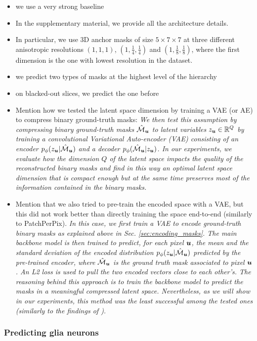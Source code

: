 \begin{itemize}
\item we use a very strong baseline
\item In the supplementary material, we provide all the architecture details.
\item In particular, we use 3D anchor masks of size $5\times 7 \times 7$ at three different anisotropic resolutions $(1,1,1)$, $(1,\frac{1}{4},\frac{1}{4})$ and $(1,\frac{1}{8},\frac{1}{8})$, where the first dimension is the one with lowest resolution in the dataset.
\item we predict two types of \maskname masks at the highest level of the hierarchy
\item on blacked-out slices, we predict the one before
\item Mention how we tested the latent space dimension by training a VAE (or AE) to compress binary ground-truth \maskname masks: \emph{We then test this assumption by compressing binary ground-truth \maskname masks $\hat{\mathcal{M}}_{\coord{u}}$ to latent variables $z_{\coord{u}}\in \mathbb{R}^Q$ by training a convolutional Variational Auto-encoder (VAE) \cite{kingma2013auto,rezende2014stochastic} consisting of an encoder $p_{\phi}(z_{\coord{u}}|\hat{\mathcal{M}}_{\coord{u}})$ and a decoder $p_{\phi}(\hat{\mathcal{M}}_{\coord{u}}|z_{\coord{u}})$.
In our experiments, we evaluate how the dimension $Q$ of the latent space impacts the quality of the reconstructed binary masks and find in this way an optimal latent space dimension that is compact enough but at the same time preserves most of the information contained in the binary masks.}
\item Mention that we also tried to pre-train the encoded space with a VAE, but this did not work better than directly training the space end-to-end (similarly to PatchPerPix). 
\emph{In this case, we first train a VAE to encode ground-truth binary masks as explained above in Sec. \ref{sec:encoding_masks}. 
The main backbone model is then trained to predict, for each pixel $\coord{u}$, the mean and the standard deviation of the encoded distribution $p_{\phi}(z_{\coord{u}}|\hat{\mathcal{M}}_{\coord{u}})$ predicted by the pre-trained encoder, where $\hat{\mathcal{M}}_{\coord{u}}$ is the ground truth \maskname mask associated to pixel $\coord{u}$. An L2 loss is used to pull the two encoded vectors close to each other's. 
The reasoning behind this approach is to train the backbone model to predict the masks in a meaningful compressed latent space. 
Nevertheless, as we will show in our experiments, this method was the least successful among the tested ones (\emph{similarly to the findings of \cite{hirsch2020patchperpix}}).}
\end{itemize}


\subsubsection{Predicting glia neurons}
